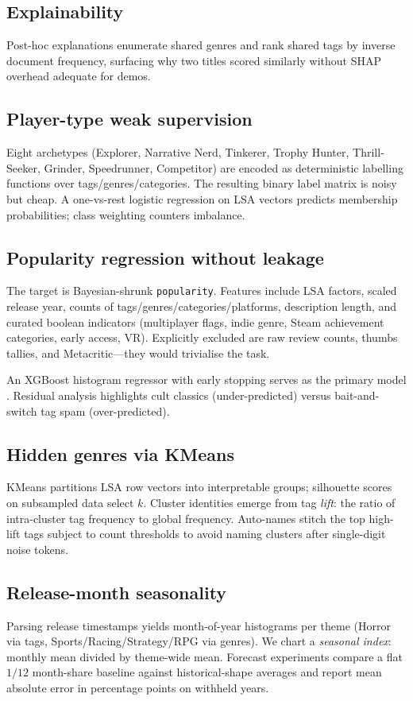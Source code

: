 \subsection{Explainability}
Post-hoc explanations enumerate shared genres and rank shared tags by inverse document frequency, surfacing why two titles scored similarly without SHAP overhead adequate for demos.

\subsection{Player-type weak supervision}
Eight archetypes (Explorer, Narrative Nerd, Tinkerer, Trophy Hunter, Thrill-Seeker, Grinder, Speedrunner, Competitor) are encoded as deterministic labelling functions over tags/genres/categories. The resulting binary label matrix is noisy but cheap. A one-vs-rest logistic regression on LSA vectors predicts membership probabilities; class weighting counters imbalance.

\subsection{Popularity regression without leakage}
The target is Bayesian-shrunk \texttt{popularity}. Features include LSA factors, scaled release year, counts of tags/genres/categories/platforms, description length, and curated boolean indicators (multiplayer flags, indie genre, Steam achievement categories, early access, VR). Explicitly excluded are raw review counts, thumbs tallies, and Metacritic---they would trivialise the task.

An XGBoost histogram regressor with early stopping serves as the primary model \cite{chen2016xgboost}. Residual analysis highlights cult classics (under-predicted) versus bait-and-switch tag spam (over-predicted).

\subsection{Hidden genres via KMeans}
KMeans partitions LSA row vectors into interpretable groups; silhouette scores on subsampled data select \(k\). Cluster identities emerge from tag \emph{lift}: the ratio of intra-cluster tag frequency to global frequency. Auto-names stitch the top high-lift tags subject to count thresholds to avoid naming clusters after single-digit noise tokens.

\subsection{Release-month seasonality}
Parsing release timestamps yields month-of-year histograms per theme (Horror via tags, Sports/Racing/Strategy/RPG via genres). We chart a \emph{seasonal index}: monthly mean divided by theme-wide mean. Forecast experiments compare a flat \(1/12\) month-share baseline against historical-shape averages and report mean absolute error in percentage points on withheld years.
